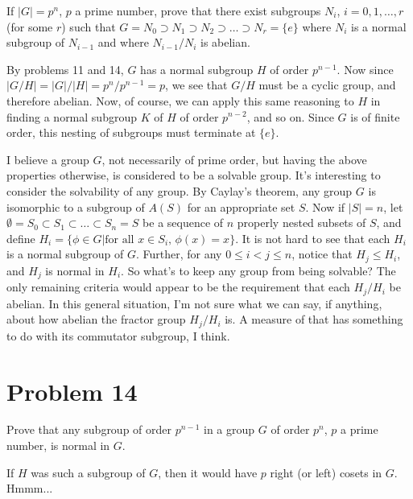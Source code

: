 \documentclass[12pt]{article}
\begin{document}
If $|G|=p^n$, $p$ a prime number, prove that there exist subgroups
$N_i$, $i=0,1,\dots,r$ (for some $r$) such that $G=N_0\supset N_1\supset N_2\supset\dots\supset N_r=\{e\}$
where $N_i$ is a normal subgroup of $N_{i-1}$ and where $N_{i-1}/N_i$ is abelian.

By problems 11 and 14, $G$ has a normal subgroup $H$ of order $p^{n-1}$.  Now since $|G/H|=|G|/|H|=p^n/p^{n-1}=p$,
we see that $G/H$ must be a cyclic group, and therefore abelian.
Now, of course, we can apply this same reasoning to $H$ in finding a normal subgroup $K$ of $H$ of order $p^{n-2}$,
and so on.  Since $G$ is of finite order, this nesting of subgroups must terminate at $\{e\}$.

I believe a group $G$, not necessarily of prime order, but having the above properties otherwise,
is considered to be a solvable group.  It's interesting to consider the solvability of any group.
By Caylay's theorem, any group $G$ is isomorphic to a subgroup of $A(S)$ for an appropriate set $S$.
Now if $|S|=n$, let $\emptyset=S_0\subset S_1\subset\dots\subset S_n=S$ be a sequence of $n$ properly nested
subsets of $S$, and define $H_i=\{\phi\in G|\mbox{for all $x\in S_i$, $\phi(x)=x$}\}$.  It is not hard to see
that each $H_i$ is a normal subgroup of $G$.
Further, for any $0\leq i<j\leq n$, notice that $H_j\leq H_i$, and $H_j$ is normal in $H_i$.  So what's to keep
any group from being solvable?  The only remaining criteria would appear to be the requirement that each $H_j/H_i$ be abelian.
In this general situation, I'm not sure what we can say, if anything, about how abelian the fractor group $H_j/H_i$ is.
A measure of that has something to do with its commutator subgroup, I think.

\section*{Problem 14}

Prove that any subgroup of order $p^{n-1}$ in a group $G$ of order $p^n$, $p$ a prime number, is normal in $G$.

If $H$ was such a subgroup of $G$, then it would have $p$ right (or left) cosets in $G$.  Hmmm...
\end{document}
